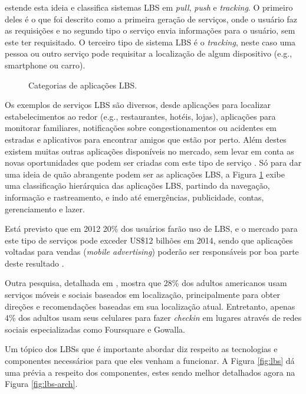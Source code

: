 \documentclass[diss]{template/setrem}
\begin{document}
\citet{GSMA2003} estende esta ideia e classifica sistemas LBS em  \emph{pull}, \emph{push} e \emph{tracking}. O primeiro deles é o que foi descrito como a primeira geração de serviços, onde o usuário faz as requisições e no segundo tipo o serviço envia informações para o usuário, sem este ter requisitado. O terceiro tipo de sistema LBS é o \emph{tracking}, neste caso uma pessoa ou outro serviço pode requisitar a localização de algum dispositivo (e.g., smartphone ou carro).

\begin{figure}[!h]
    \caption{Categorias de aplicações LBS.}
    \label{fig:lbs-types}
\end{figure}

Os exemplos de serviços LBS são diversos, desde aplicações para localizar estabelecimentos ao redor (e.g., restaurantes, hotéis, lojas), aplicações para monitorar familiares, notificações sobre congestionamentos ou acidentes em estradas e aplicativos para encontrar amigos que estão por perto. Além destes existem muitas outras aplicações disponíveis no mercado, sem levar em conta as novas oportunidades que podem ser criadas com este tipo de serviço \citep{Holdener2011}. Só para dar uma ideia de quão abrangente podem ser as aplicações LBS, a Figura \ref{fig:lbs-types} exibe uma classificação hierárquica das aplicações LBS, partindo da navegação, informação e rastreamento, e indo até emergências, publicidade, contas, gerenciamento e lazer.

Está previsto que em 2012 20\% dos usuários farão uso de LBS, e o mercado para este tipo de serviços pode exceder US\$12 bilhões em 2014, sendo que aplicações voltadas para vendas (\emph{mobile advertising}) poderão ser responsáveis por boa parte deste resultado \citep{GSMA2003}.

Outra pesquisa, detalhada em \citet{Zickuhr2011}, mostra que 28\% dos adultos americanos usam serviços móveis e sociais baseados em localização, principalmente para obter direções e recomendações baseadas em sua localização atual. Entretanto, apenas 4\% dos adultos usam seus celulares para fazer \emph{checkin} em lugares através de redes sociais especializadas como Foursquare e Gowalla.

Um tópico dos LBSs que é importante abordar diz respeito as tecnologias e componentes necessários para que eles venham a funcionar. A Figura \ref{fig:lbs} dá uma prévia a respeito dos componentes, estes sendo melhor detalhados agora na Figura \ref{fig:lbs-arch}.
\end{document}
